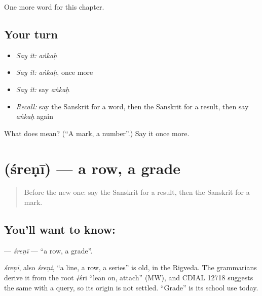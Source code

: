 \begin{grammarlens}[title={What you've built}]
One more word for this chapter.
\end{grammarlens}

\subsection*{Your turn}
\begin{itemize}
\raggedright
  \item \emph{Say it:} \emph{aṅkaḥ}
  \item \emph{Say it:} \emph{aṅkaḥ}, once more
  \item \emph{Say it:} say \emph{aṅkaḥ}
  \item \emph{Recall:} say the Sanskrit for a word, then the Sanskrit for a result, then say \emph{aṅkaḥ} again
\end{itemize}

\begin{tcolorbox}[breakable,colback=teal!4,colframe=teal!35!black,title={Before you move on}]
What does  mean? (\textquotedblleft{}A mark, a number\textquotedblright{}.) Say it once more.
\end{tcolorbox}
\section[\texorpdfstring{\sk{श्रेणी} (śreṇī)}{श्रेणी (śreṇī)}]{ (śreṇī) — a row, a grade}

\label{lesson:SA-C169-sreni}



\begin{quote}
Before the new one: say the Sanskrit for a result, then the Sanskrit for a mark.
\end{quote}

\subsection*{You'll want to know: }
\textbf{} — \emph{śreṇī} — \textquotedblleft{}a row, a grade\textquotedblright{}.

\begin{cousinweb}
\emph{śreṇī}, also \emph{śreṇi}, \textquotedblleft{}a line, a row, a series\textquotedblright{} is old, in the Rigveda. The grammarians derive it from the root √śri \textquotedblleft{}lean on, attach\textquotedblright{} (MW), and CDIAL 12718 suggests the same with a query, so its origin is not settled. \textquotedblleft{}Grade\textquotedblright{} is its school use today.
\end{cousinweb}

